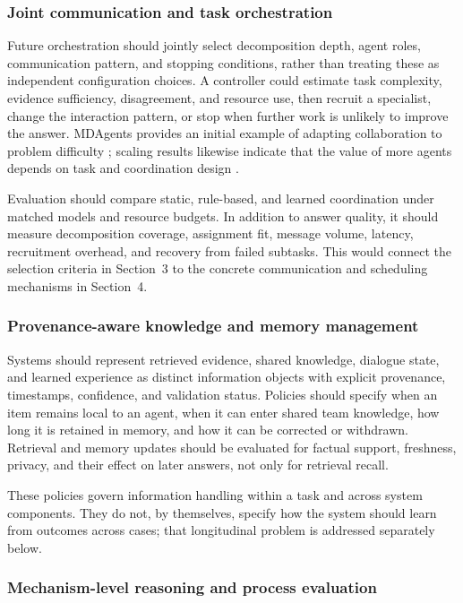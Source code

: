 \documentclass[a4paper,fleqn]{cas-dc}
\begin{document}
\subsubsection{Joint communication and task orchestration}

Future orchestration should jointly select decomposition depth, agent roles,
communication pattern, and stopping conditions, rather than treating these as
independent configuration choices. A controller could estimate task
complexity, evidence sufficiency, disagreement, and resource use, then recruit
a specialist, change the interaction pattern, or stop when further work is
unlikely to improve the answer. MDAgents provides an initial example of
adapting collaboration to problem difficulty \citep{kim2024mdagents}; scaling
results likewise indicate that the value of more agents depends on task and
coordination design \citep{qian2024scaling_multiagent}.

Evaluation should compare static, rule-based, and learned coordination under
matched models and resource budgets. In addition to answer quality, it should
measure decomposition coverage, assignment fit, message volume, latency,
recruitment overhead, and recovery from failed subtasks. This would connect
the selection criteria in Section~3 to the concrete communication and
scheduling mechanisms in Section~4.

\subsubsection{Provenance-aware knowledge and memory management}

Systems should represent retrieved evidence, shared knowledge, dialogue
state, and learned experience as distinct information objects with explicit
provenance, timestamps, confidence, and validation status. Policies should
specify when an item remains local to an agent, when it can enter shared team
knowledge, how long it is retained in memory, and how it can be corrected or
withdrawn. Retrieval and memory updates should be evaluated for factual
support, freshness, privacy, and their effect on later answers, not only for
retrieval recall.

These policies govern information handling within a task and across system
components. They do not, by themselves, specify how the system should learn
from outcomes across cases; that longitudinal problem is addressed separately
below.

\subsubsection{Mechanism-level reasoning and process evaluation}
\end{document}
